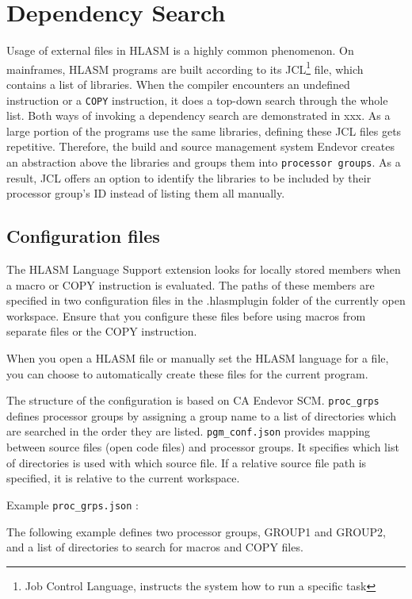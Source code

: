 \chapter{Dependency Search}

Usage of external files in HLASM is a highly common phenomenon. On mainframes, HLASM programs are built according to its JCL\footnote{Job Control Language, instructs the system how to run a specific task} file, which contains a list of libraries. When the compiler encounters an undefined instruction or a \texttt{COPY} instruction, it does a top-down search through the whole list. Both ways of invoking a dependency search are demonstrated in xxx. As a large portion of the programs use the same libraries, defining these JCL files gets repetitive. Therefore, the build and source management system Endevor creates an abstraction above the libraries and groups them into \texttt{processor groups}. As a result, JCL offers an option to identify the libraries to be included by their processor group's ID instead of listing them all manually.

\section{Configuration files}

The HLASM Language Support extension looks for locally stored members when a macro or COPY instruction is evaluated. The paths of these members are specified in two configuration files in the .hlasmplugin folder of the currently open workspace. Ensure that you configure these files before using macros from separate files or the COPY instruction.

When you open a HLASM file or manually set the HLASM language for a file, you can choose to automatically create these files for the current program.

The structure of the configuration is based on CA Endevor SCM. \texttt{proc\_grps} defines processor groups by assigning a group name to a list of directories which are searched in the order they are listed. \texttt{pgm\_conf.json} provides mapping between source files (open code files) and processor groups. It specifies which list of directories is used with which source file. If a relative source file path is specified, it is relative to the current workspace.

Example \texttt{proc\_grps.json} :

The following example defines two processor groups, GROUP1 and GROUP2, and a list of directories to search for macros and COPY files.


